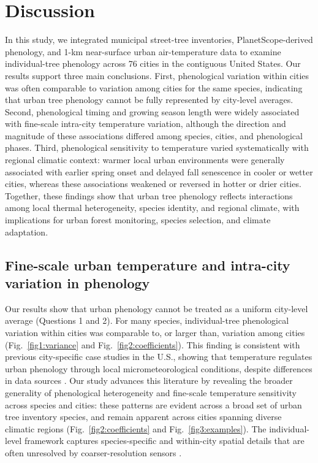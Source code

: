 \section{Discussion}
In this study, we integrated municipal street-tree inventories, PlanetScope-derived phenology, and 1-km near-surface urban air-temperature data to examine individual-tree phenology across 76 cities in the contiguous United States. Our results support three main conclusions. First, phenological variation within cities was often comparable to variation among cities for the same species, indicating that urban tree phenology cannot be fully represented by city-level averages. Second, phenological timing and growing season length were widely associated with fine-scale intra-city temperature variation, although the direction and magnitude of these associations differed among species, cities, and phenological phases. Third, phenological sensitivity to temperature varied systematically with regional climatic context: warmer local urban environments were generally associated with earlier spring onset and delayed fall senescence in cooler or wetter cities, whereas these associations weakened or reversed in hotter or drier cities. Together, these findings show that urban tree phenology reflects interactions among local thermal heterogeneity, species identity, and regional climate, with implications for urban forest monitoring, species selection, and climate adaptation.

\subsection{Fine-scale urban temperature and intra-city variation in phenology}

Our results show that urban phenology cannot be treated as a uniform city-level average (Questions 1 and 2). For many species, individual-tree phenological variation within cities was comparable to, or larger than, variation among cities (Fig.~\ref{fig1:variance} and Fig.~\ref{fig2:coefficients}). This finding is consistent with previous city-specific case studies in the U.S., showing that temperature regulates urban phenology through local micrometeorological conditions, despite differences in data sources \citep{Crawford2024ERL, Katz2019STOTEN, Parece2018UrbanSci, Wu2025NatCommun, Zipper2016ERL}. Our study advances this literature by revealing the broader generality of phenological heterogeneity and fine-scale temperature sensitivity across species and cities: these patterns are evident across a broad set of urban tree inventory species, and remain apparent across cities spanning diverse climatic regions (Fig.~\ref{fig2:coefficients} and Fig.~\ref{fig3:examples}). The individual-level framework captures species-specific and within-city spatial details that are often unresolved by coarser-resolution sensors \citep{badeck_responses_2004, zeng_review_2020, Zhao2022RSE}. 

